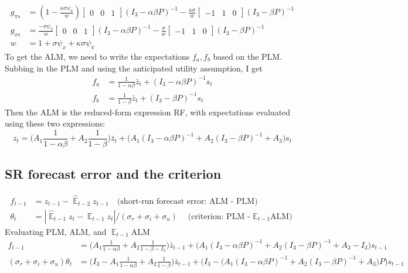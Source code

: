 \documentclass[11pt]{article}
\renewcommand{\[}{\begin{equation}}
\renewcommand{\]}{\end{equation}}
\DeclareMathOperator{\E}{\mathbb{E}}
\begin{document}
\begin{align}
g_{\pi s} & = (1-\frac{\kappa\sigma\psi_{\pi}}{w} )\begin{bmatrix} 0&0&1 \end{bmatrix} (I_3 - \alpha\beta P)^{-1} -\frac{\kappa\sigma}{w}\begin{bmatrix} -1&1&0 \end{bmatrix} (I_3 -\beta P)^{-1}\\
g_{x s} & =  \frac{-\sigma\psi_{\pi}}{w} \begin{bmatrix} 0&0&1 \end{bmatrix}(I_3 - \alpha\beta P)^{-1}  -\frac{\sigma}{w}\begin{bmatrix} -1&1&0 \end{bmatrix}(I_3 -\beta P)^{-1}\\
w & = 1+\sigma\psi_x +\kappa\sigma\psi_{\pi}
\end{align}
To get the ALM, we need to write the expectations $f_a, f_b$ based on the PLM. Subbing in the PLM and using the anticipated utility assumption, I get
\begin{align}
f_a & = \frac{1}{1-\alpha\beta}\bar{z}_t + (I_3-\alpha\beta P)^{-1}s_t \\
f_b & = \frac{1}{1-\beta}\bar{z}_t + (I_3-\beta P)^{-1}s_t 
\end{align}
Then the ALM is the reduced-form expression RF, with expectations evaluated using these two expressions:
\begin{equation}
z_t = \bigg(A_1\frac{1}{1-\alpha\beta} +A_2\frac{1}{1-\beta}\bigg)\bar{z}_t + \bigg(A_1(I_3 - \alpha\beta P)^{-1} +A_2(I_3 - \beta P)^{-1} +A_3\bigg)s_t \tag{ALM}
\end{equation}

\subsection{SR forecast error and the criterion}

\begin{align*}
f_{t-1} & = z_{t-1} - \hat{\E}_{t-2}z_{t-1} \quad \text{(short-run forecast error: ALM - PLM)} \\
\theta_t & = |\hat{\E}_{t-1}z_t - \E_{t-1}z_t  | / (\sigma_r + \sigma_i + \sigma_u) \quad \text{(criterion: PLM - $\E_{t-1}$ALM)}
\end{align*}
Evaluating PLM, ALM, and $\E_{t-1}$ALM
\begin{align}
f_{t-1} & = \bigg(A_1\frac{1}{1-\alpha\beta} +A_2\frac{1}{1-\beta -I_3}\bigg)\bar{z}_{t-1} + \bigg(A_1(I_3 - \alpha\beta P)^{-1} +A_2(I_3 - \beta P)^{-1} +A_3 -I_3\bigg)s_{t-1} \\
(\sigma_r + \sigma_i + \sigma_u) \theta_t & = \bigg(I_3 - A_1\frac{1}{1-\alpha\beta} +A_2\frac{1}{1-\beta}\bigg)\bar{z}_{t-1} + \bigg(I_3 - \big(A_1(I_3 - \alpha\beta P)^{-1} +A_2(I_3 - \beta P)^{-1} +A_3\big)P \bigg)s_{t-1}
\end{align}
\end{document}
